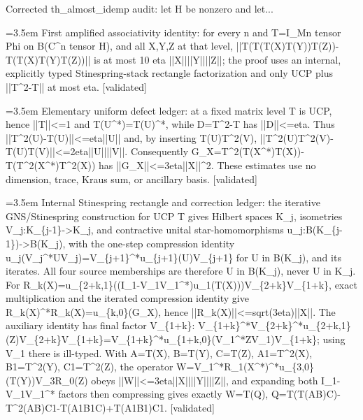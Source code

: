 \documentclass{article}
\newcommand{\step}[1]{\par\noindent\hangindent=3.5em\hangafter=1%
  \makebox[3.5em][l]{\textbf{#1.}}}
\newcommand{\steptag}[1]{\hfill{\small\textsf{[#1]}}}
\begin{document}
\begin{proofbox}{Corrected th\_almost\_idemp audit: let H be nonzero and let...}
\step{1.2} First amplified associativity identity: for every n and T=I\_Mn tensor Phi on B(C\textasciicircum{}n tensor H), and all X,Y,Z at that level, ||T(T(T(X)T(Y))T(Z))-T(T(X)T(Y)T(Z))|| is at most 10 eta ||X||||Y||||Z||; the proof uses an internal, explicitly typed Stinespring-stack rectangle factorization and only UCP plus ||T\textasciicircum{}2-T|| at most eta. \steptag{validated} \\[6pt]
\step{1.2.1} Elementary uniform defect ledger: at a fixed matrix level T is UCP, hence ||T||<=1 and T(U\textasciicircum{}*)=T(U)\textasciicircum{}*, while D=T\textasciicircum{}2-T has ||D||<=eta. Thus ||T\textasciicircum{}2(U)-T(U)||<=eta||U|| and, by inserting T(U)T\textasciicircum{}2(V), ||T\textasciicircum{}2(U)T\textasciicircum{}2(V)-T(U)T(V)||<=2eta||U||||V||. Consequently G\_X=T\textasciicircum{}2(T(X\textasciicircum{}*)T(X))-T(T\textasciicircum{}2(X\textasciicircum{}*)T\textasciicircum{}2(X)) has ||G\_X||<=3eta||X||\textasciicircum{}2. These estimates use no dimension, trace, Kraus sum, or ancillary basis. \steptag{validated} \\[4pt]
\step{1.2.2} Internal Stinespring rectangle and correction ledger: the iterative GNS/Stinespring construction for UCP T gives Hilbert spaces K\_j, isometries V\_j:K\_\{j-1\}->K\_j, and contractive unital star-homomorphisms u\_j:B(K\_\{j-1\})->B(K\_j), with the one-step compression identity u\_j(V\_j\textasciicircum{}*UV\_j)=V\_\{j+1\}\textasciicircum{}*u\_\{j+1\}(U)V\_\{j+1\} for U in B(K\_j), and its iterates. All four source memberships are therefore U in B(K\_j), never U in K\_j. For R\_k(X)=u\_\{2+k,1\}((I\_1-V\_1V\_1\textasciicircum{}*)u\_1(T(X)))V\_\{2+k\}V\_\{1+k\}, exact multiplication and the iterated compression identity give R\_k(X)\textasciicircum{}*R\_k(X)=u\_\{k,0\}(G\_X), hence ||R\_k(X)||<=sqrt(3eta)||X||. The auxiliary identity has final factor V\_\{1+k\}: V\_\{1+k\}\textasciicircum{}*V\_\{2+k\}\textasciicircum{}*u\_\{2+k,1\}(Z)V\_\{2+k\}V\_\{1+k\}=V\_\{1+k\}\textasciicircum{}*u\_\{1+k,0\}(V\_1\textasciicircum{}*ZV\_1)V\_\{1+k\}; using V\_1 there is ill-typed. With A=T(X), B=T(Y), C=T(Z), A1=T\textasciicircum{}2(X), B1=T\textasciicircum{}2(Y), C1=T\textasciicircum{}2(Z), the operator W=V\_1\textasciicircum{}*R\_1(X\textasciicircum{}*)\textasciicircum{}*u\_\{3,0\}(T(Y))V\_3R\_0(Z) obeys ||W||<=3eta||X||||Y||||Z||, and expanding both I\_1-V\_1V\_1\textasciicircum{}* factors then compressing gives exactly W=T(Q), Q=T(T(AB)C)-T\textasciicircum{}2(AB)C1-T(A1B1C)+T(A1B1)C1. \steptag{validated} \\[6pt]

\end{proofbox}
\end{document}
